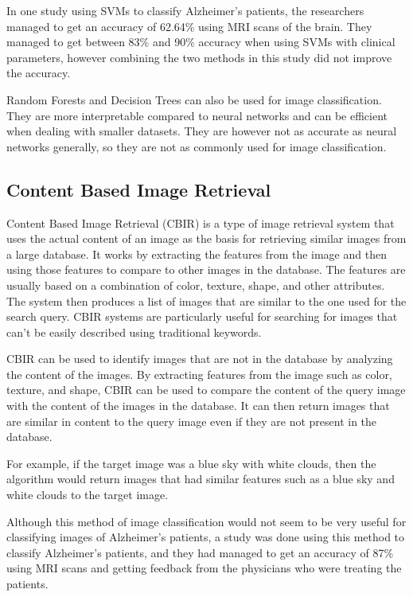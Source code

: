 \documentclass[]{final_report}
\begin{document}
In one study using SVMs to classify Alzheimer's patients, the researchers managed to get an accuracy of 62.64\% using MRI scans of the brain.
They managed to get between 83\% and 90\% accuracy when using SVMs with clinical parameters, however combining the two methods in this study did not improve the accuracy. \cite{10.3389/fneur.2021.640696}

Random Forests and Decision Trees can also be used for image classification. They are more interpretable compared to neural networks and can be efficient when dealing with smaller datasets. They are however not as accurate as neural networks generally, so they are not as commonly used for image classification.

\subsection{Content Based Image Retrieval}
Content Based Image Retrieval (CBIR) is a type of image retrieval system that uses the actual content of an image as the basis for retrieving similar
images from a large database. It works by extracting the features from the image and then using those features to compare to other images in the database.
The features are usually based on a combination of color, texture, shape, and other attributes. The system then produces a list of images that are similar
to the one used for the search query. CBIR systems are particularly useful for searching for images that can't be easily described using traditional keywords.

CBIR can be used to identify images that are not in the database by analyzing the content of the images.
By extracting features from the image such as color, texture, and shape, CBIR can be used to compare the
content of the query image with the content of the images in the database. It can then return images that are
similar in content to the query image even if they are not present in the database.

For example, if the target image was a blue sky with white clouds, then the algorithm would return
images that had similar features such as a blue sky and white clouds to the target image.

Although this method of image classification would not seem to be very useful for classifying images of Alzheimer's patients,
a study was done using this method to classify Alzheimer's patients, and they had managed to get an accuracy of 87\% using MRI scans\cite{5972513}
and getting feedback from the physicians who were treating the patients.
\end{document}
